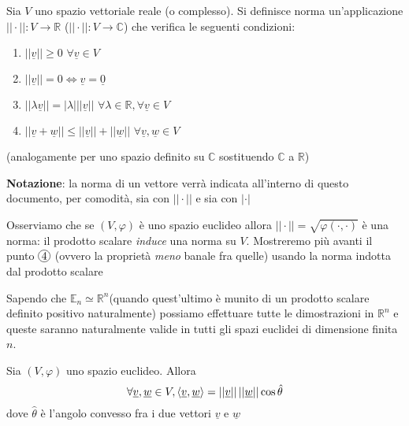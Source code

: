 \documentclass[openany, italian]{book}
\begin{document}
\begin{definition}[norma]
	Sia $V$ uno spazio vettoriale reale (o complesso). Si definisce norma un'applicazione $|| \cdot ||: V \to \mathbb{R}$ ($|| \cdot ||: V \to \mathbb{C}$) che verifica le seguenti condizioni:
	\begin{enumerate}[label=\protect\circled{\arabic*}]
		\item $||\underline{v}|| \geq 0 \, \, \forall \underline{v} \in V$
		\item $|| \underline{v} || = 0 \iff \underline{v} = \underline{0}$
		\item $|| \lambda \underline{v} || = | \lambda | || \underline{v} || \, \, \forall \lambda \in \mathbb{R}, \forall \underline{v} \in V$
		\item $|| \underline{v} + \underline{w} || \leq || \underline{v} || + || \underline{w} || \, \, \forall \underline{v}, \underline{w} \in V$
	\end{enumerate}
	(analogamente per uno spazio definito su $\mathbb{C}$ sostituendo $\mathbb{C}$ a $\mathbb{R}$)
\end{definition}
\noindent \textbf{Notazione}: la norma di un vettore verrà indicata all'interno di questo documento, per comodità, sia con $||\cdot||$ e sia con $|\cdot|$
\begin{remark}
Osserviamo che se $(V, \varphi)$ è uno spazio euclideo allora $|| \cdot || = \sqrt{\varphi(\cdot, \cdot)}$ è una norma: il prodotto scalare \emph{induce} una norma su $V$. Mostreremo più avanti il punto $\circled{4}$ (ovvero la proprietà \emph{meno} banale fra quelle) usando la norma indotta dal prodotto scalare
\end{remark}
\noindent Sapendo che $\mathbb{E}_n \simeq \mathbb{R}^n$(quando quest'ultimo è munito di un prodotto scalare definito positivo naturalmente) possiamo effettuare tutte le dimostrazioni in $\mathbb{R}^n$ e queste saranno naturalmente valide in tutti gli spazi euclidei di dimensione finita $n$. 
\begin{theorem} Sia $(V, \varphi)$ uno spazio euclideo. Allora $$\forall \underline{v}, \underline{w} \in V, \langle \underline{v}, \underline{w} \rangle = ||\underline{v}|| \, || \underline{w} || \cos{\hat{\theta}}$$
dove $\hat{\theta}$ è l'angolo convesso fra i due vettori $\underline{v}$ e $\underline{w}$
\end{theorem}
\end{document}
